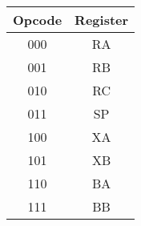 \documentclass{standalone}
\begin{document}
\begin{minipage}[t][6cm][t]{0.4\textwidth}
    \begin{tabular}{|c|c|}
        \hline
        \textbf{Opcode} & \textbf{Register} \\ \hline
        000 & RA \\ \hline
        001 & RB \\ \hline
        010 & RC \\ \hline
        011 & SP \\ \hline
        100 & XA \\ \hline
        101 & XB \\ \hline
        110 & BA \\ \hline
        111 & BB \\ \hline
    \end{tabular}
\end{minipage}
\end{document}
